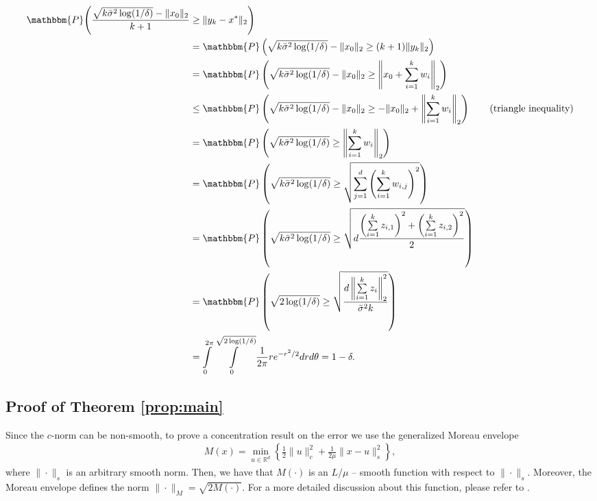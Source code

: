 \documentclass[letterpaper, 10 pt]{article}
\newcommand{\Prob}{\mathbbm{P}}
\begin{document}
\begin{align*}
    \Prob\Bigg( \frac{\sqrt{k\bar{\sigma}^2 \log(1/\delta)}-\|x_0\|_2}{k+1} &\geq \|y_k-x^*\|_2\Bigg) \\
    &= \Prob\left( \sqrt{k\bar{\sigma}^2 \log(1/\delta)}-\|x_0\|_2 \geq (k+1)\|y_k\|_2\right) \\
    &= \Prob\left( \sqrt{k\bar{\sigma}^2 \log(1/\delta)}-\|x_0\|_2 \geq \left\|x_0+ \sum_{i=1}^k w_i\right\|_2\right) \\
    &\leq \Prob\left( \sqrt{k\bar{\sigma}^2 \log(1/\delta)}-\|x_0\|_2 \geq - \|x_0\|_2 + \left\|\sum_{i=1}^k w_i\right\|_2 \right) \tag{triangle inequality}\\
    &= \Prob\left( \sqrt{k\bar{\sigma}^2\log(1/\delta)} \geq \left\|\sum_{i=1}^k w_i\right \|_2\right) \\
    &= \Prob\left( \sqrt{k\bar{\sigma}^2\log(1/\delta)} \geq \sqrt{\sum\limits_{j=1}^d \left(\sum\limits_{i=1}^k w_{i,j}\right)^2} \right) \\
    &= \Prob\left( \sqrt{k\bar{\sigma}^2\log(1/\delta)} \geq \sqrt{d\frac{\left(\sum\limits_{i=1}^k z_{i,1}\right)^2 + \left( \sum\limits_{i=1}^k z_{i,2} \right)^2}{2}}\right) \\
    &= \Prob\left( \sqrt{2\log(1/\delta)}\geq \sqrt{\frac{d\left\|\sum\limits_{i=1}^k z_i \right\|_2^2  }{\bar{\sigma}^2k}}\right) \\
    &= \int\limits_{0}^{2\pi}\int\limits_{0}^{\sqrt{2\log(1/\delta)}} \frac{1}{2\pi}re^{-r^2/2}drd\theta=1-\delta.
\end{align*}





\subsection{Proof of Theorem \ref{prop:main}} \label{proof:prop_main}

Since the $c$-norm can be non-smooth, to prove a concentration result on the error we use the generalized Moreau envelope 
    \begin{align*}    
    M(x) = \min_{u\in\mathbb{R}^d} \left\{ \frac{1}{2}\|u\|_c^2 + \frac{1}{2\mu} \|x-u\|_s^2 \right\}, 
    \end{align*} 
where $\|\cdot\|_s$ is an arbitrary smooth norm. Then, we have that $M(\cdot)$ is an $L/\mu$ -- smooth function with respect to $\|\cdot\|_s$. Moreover, the Moreau envelope defines the norm $\|\cdot\|_M= \sqrt{2M(\cdot)}$. For a more detailed discussion about this function, please refer to \cite{chen2020finite}.
    
\end{document}
